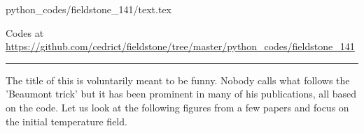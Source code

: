 \begin{flushright} {\tiny {\color{gray} python\_codes/fieldstone\_141/text.tex}} \end{flushright}



\begin{center}

Codes at \url{https://github.com/cedrict/fieldstone/tree/master/python_codes/fieldstone_141}
\end{center}

\par\noindent\rule{\textwidth}{0.4pt}




The title of this \stone is voluntarily meant to be funny. 
Nobody calls what follows the 'Beaumont trick' but it has been 
prominent in many of his publications, all based on the \sopale code.
Let us look at the following figures from a few papers and focus on the 
initial temperature field.

